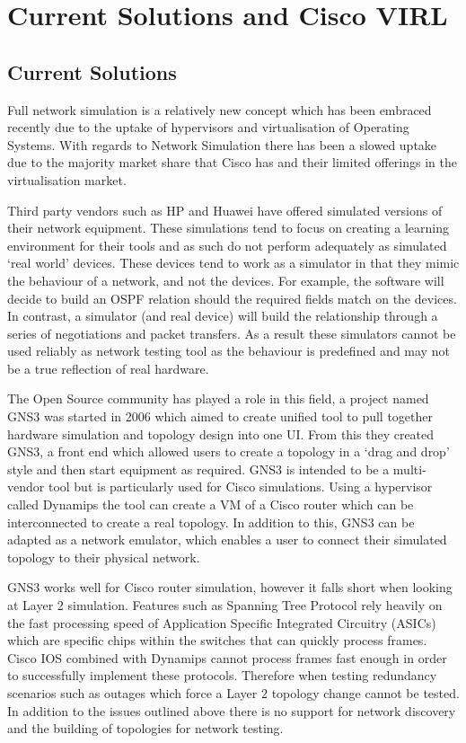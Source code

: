 \documentclass[11pt]{report}
\begin{document}
\chapter{Current Solutions and Cisco VIRL}

\section{Current Solutions}

Full network simulation is a relatively new concept which has been embraced recently due to the uptake of hypervisors and virtualisation of Operating Systems. With regards to Network Simulation there has been a slowed uptake due to the majority market share that Cisco has and their limited offerings in the virtualisation market.

Third party vendors such as HP and Huawei have offered simulated versions of their network equipment. These simulations tend to focus on creating a learning environment for their tools and as such do not perform adequately as simulated ‘real world’ devices. These devices tend to work as a simulator in that they mimic the behaviour of a network, and not the devices. For example, the software will decide to build an OSPF relation should the required fields match on the devices. In contrast, a simulator (and real device) will build the relationship through a series of negotiations and packet transfers. As a result these simulators cannot be used reliably as network testing tool as the behaviour is predefined and may not be a true reflection of real hardware.

The Open Source community has played a role in this field, a project named GNS3 was started in 2006 which aimed to create  unified tool to pull together hardware simulation and topology design into one UI. From this they created GNS3, a front end which allowed users to create a topology in a ‘drag and drop’ style and then start equipment as required. GNS3 is intended to be a multi-vendor tool but is particularly used for Cisco simulations. Using a hypervisor called Dynamips the tool can create a VM of a Cisco router which can be interconnected to create a real topology. In addition to this, GNS3 can be adapted as a network emulator, which enables a user to connect their simulated topology to their physical network.

GNS3 works well for Cisco router simulation, however it falls short when looking at Layer 2 simulation. Features such as Spanning Tree Protocol rely heavily on the fast processing speed of Application Specific Integrated Circuitry (ASICs) which are specific chips within the switches that can quickly process frames. Cisco IOS combined with Dynamips cannot process frames fast enough in order to successfully implement these protocols. Therefore when testing redundancy scenarios such as outages which force a Layer 2 topology change cannot be tested. In addition to the issues outlined above there is no support for network discovery and the building of topologies for network testing.
\end{document}
